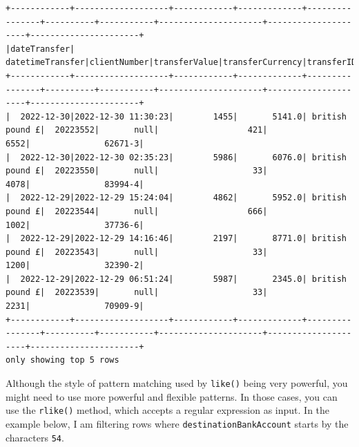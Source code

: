 \documentclass[
  11pt,
  letterpaper,
  DIV=11,
  numbers=noendperiod]{scrreprt}
\newenvironment{Shaded}{\begin{snugshade}}{\end{snugshade}}
\newcommand{\DecValTok}[1]{\textcolor[rgb]{0.68,0.00,0.00}{#1}}
\newcommand{\NormalTok}[1]{\textcolor[rgb]{0.00,0.23,0.31}{#1}}
\newcommand{\OperatorTok}[1]{\textcolor[rgb]{0.37,0.37,0.37}{#1}}
\newcommand{\SpecialCharTok}[1]{\textcolor[rgb]{0.37,0.37,0.37}{#1}}
\newcommand{\StringTok}[1]{\textcolor[rgb]{0.13,0.47,0.30}{#1}}
\begin{document}
\begin{verbatim}
+------------+-------------------+------------+-------------+----------------+----------+-----------+---------------------+---------------------+----------------------+
|dateTransfer|   datetimeTransfer|clientNumber|transferValue|transferCurrency|transferID|transferLog|destinationBankNumber|destinationBankBranch|destinationBankAccount|
+------------+-------------------+------------+-------------+----------------+----------+-----------+---------------------+---------------------+----------------------+
|  2022-12-30|2022-12-30 11:30:23|        1455|       5141.0| british pound £|  20223552|       null|                  421|                 6552|               62671-3|
|  2022-12-30|2022-12-30 02:35:23|        5986|       6076.0| british pound £|  20223550|       null|                   33|                 4078|               83994-4|
|  2022-12-29|2022-12-29 15:24:04|        4862|       5952.0| british pound £|  20223544|       null|                  666|                 1002|               37736-6|
|  2022-12-29|2022-12-29 14:16:46|        2197|       8771.0| british pound £|  20223543|       null|                   33|                 1200|               32390-2|
|  2022-12-29|2022-12-29 06:51:24|        5987|       2345.0| british pound £|  20223539|       null|                   33|                 2231|               70909-9|
+------------+-------------------+------------+-------------+----------------+----------+-----------+---------------------+---------------------+----------------------+
only showing top 5 rows
\end{verbatim}

Although the style of pattern matching used by \texttt{like()} being
very powerful, you might need to use more powerful and flexible
patterns. In those cases, you can use the \texttt{rlike()} method, which
accepts a regular expression as input. In the example below, I am
filtering rows where \texttt{destinationBankAccount} starts by the
characters \texttt{54}.

\begin{Shaded}
\end{Shaded}
\end{document}
